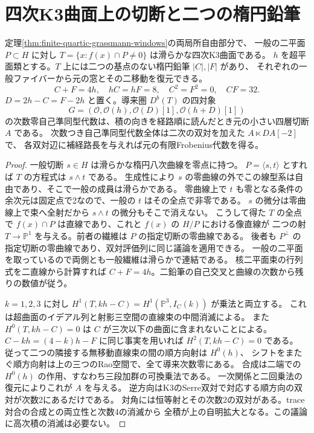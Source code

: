 \section{四次K3曲面上の切断と二つの楕円鉛筆}
\label{sec:finite-quartic-k3-cut}
\begin{theorem}\label{thm:finite-quartic-k3-cut}
定理\ref{thm:finite-quartic-grassmann-windows}の両局所自由部分で、
一般の二平面 $P\subset H$ に対し $T=\{x:f(x)\cap P\ne0\}$ は滑らかな四次K3曲面である。
$h$ を超平面類とする。$T$ 上には二つの基点のない楕円鉛筆 $|C|,|F|$ があり、
それぞれの一般ファイバーから元の窓とその二移動を復元できる。
\[
 C+F=4h,\quad hC=hF=8,\quad C^2=F^2=0,\quad CF=32 .
\]
$D=2h-C=F-2h$ と置く。導来圏 $D^b(T)$ の四対象
\[
 G=(\mathcal O,\mathcal O(h),\mathcal O(D)[1],\mathcal O(h+D)[1])
\]
の次数零自己準同型代数は、積の向きを経路順に読んだとき元の小さい四層切断 $A$ である。
次数つき自己準同型代数全体は二次の双対を加えた $A\ltimes DA[-2]$ で、
各双対辺に補経路長を与えれば元の有限Frobenius代数を得る。
\end{theorem}
\begin{proof}
一般切断 $s\in H$ は滑らかな楕円八次曲線を零点に持つ。
$P=\langle s,t\rangle$ とすれば $T$ の方程式は $s\wedge t$ である。
生成性により $s$ の零曲線の外でこの線型系は自由であり、そこで一般の成員は滑らかである。
零曲線上で $t$ も零となる条件の余次元は固定点で2なので、一般の $t$ はその全点で非零である。
$s$ の微分は零曲線上で束へ全射だから $s\wedge t$ の微分もそこで消えない。
こうして得た $T$ の全点で $f(x)\cap P$ は直線であり、これと $f(x)$ の $H/P$ における像直線が
二つの射 $T\to\mathbb P^1$ を与える。前者の繊維は $P$ の指定切断の零曲線である。
後者も $P^\perp$ の指定切断の零曲線であり、双対評価列に同じ議論を適用できる。
一般の二平面を取っているので両側とも一般繊維は滑らかで連結である。
核二平面束の行列式を二直線から計算すれば $C+F=4h$。二鉛筆の自己交叉と曲線の次数から残りの数値が従う。

$k=1,2,3$ に対し $H^1(T,kh-C)=H^1(\mathbb P^3,I_C(k))$ が乗法と両立する。
これは超曲面のイデアル列と射影三空間の直線束の中間消滅による。
また $H^0(T,kh-C)=0$ は $C$ が三次以下の曲面に含まれないことによる。
$C-kh=(4-k)h-F$ に同じ事実を用いれば $H^2(T,kh-C)=0$ である。
従って二つの隣接する無移動直線束の間の順方向射は $H^0(h)$、
シフトをまたぐ順方向射は上の三つのRao空間で、全て導来次数零にある。
合成は二端での $H^0(h)$ の作用、すなわち三段加群の可換乗法である。
一次関係と二回乗法の復元によりこれが $A$ を与える。
逆方向はK3のSerre双対で対応する順方向の双対が次数2にあるだけである。
対角には恒等射とその次数2の双対がある。trace対合の合成との両立性と次数4の消滅から
全積が上の自明拡大となる。この議論に高次積の消滅は必要ない。
\end{proof}

